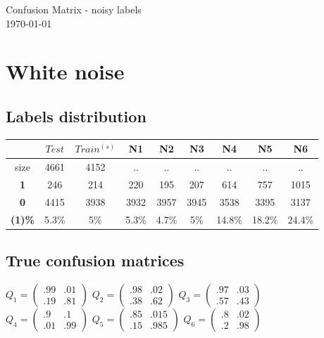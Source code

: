 \documentclass[10pt]{article}
\newcommand{\1}{\mathbbm{1}}
\newcommand{\0}{\mathbf{0}}
\begin{document}
\begin{center}
\sc\Large Confusion Matrix - noisy labels \\ {\small\today}
\end{center}
\section{White noise}
\subsection*{Labels distribution}
\begin{table}[H]
\centering
\begin{tabular}{|c|c|c|c|c|c|c|c|c|}
\hline
&$Test$ & $Train^{(s)}$ & N1 & N2 & N3 & N4 & N5 & N6\\
\hline
size          & 4661  & 4152 & ..     & ..    & ..   & ..     & ..     & ..\\
\textbf{1}    & 246   & 214  & 220    & 195   & 207  & 614    & 757    & 1015\\
\textbf{0}    & 4415  & 3938 & 3932   & 3957  & 3945 & 3538   & 3395   & 3137\\
\textbf{(1)\%}& 5.3\% & 5\%  & 5.3\%  & 4.7\% & 5\%  & 14.8\% & 18.2\% & 24.4\%\\
\hline
\end{tabular}
\end{table}

\subsection*{True confusion matrices}
\begin{center}
$Q_1=\begin{pmatrix}.99&.01\\.19&.81\end{pmatrix}$
$Q_2=\begin{pmatrix}.98&.02\\.38&.62\end{pmatrix}$
$Q_3=\begin{pmatrix}.97&.03\\.57&.43\end{pmatrix}$
\\
$Q_4=\begin{pmatrix}.9&.1\\.01&.99\end{pmatrix}$
$Q_5=\begin{pmatrix}.85&.015\\.15&.985\end{pmatrix}$
$Q_6=\begin{pmatrix}.8&.02\\.2&.98\end{pmatrix}$
\end{center}
\end{document}
